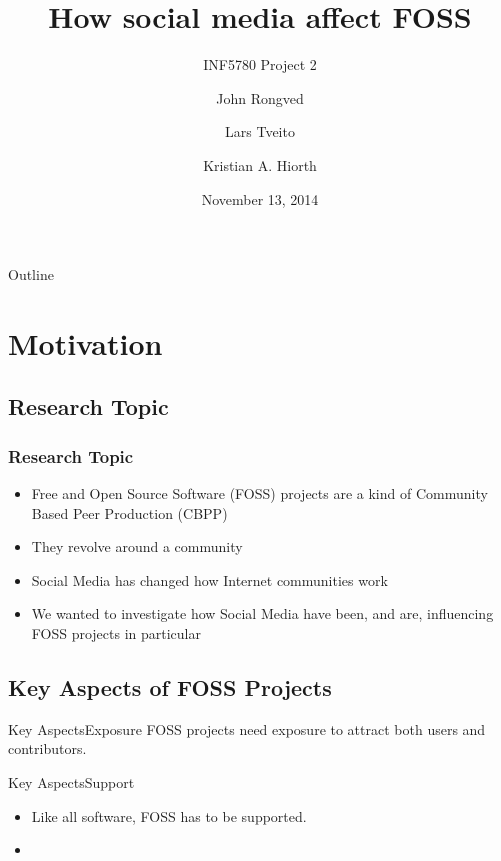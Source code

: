 \documentclass{beamer}
\title{How social media affect FOSS}
\subtitle{INF5780 Project 2}
\author{{John Rongved} \and {Lars Tveito} \and {Kristian A. Hiorth}}
\date{November 13, 2014}
\institute{Department of Informatics\\University of Oslo}
\begin{document}
\begin{frame}
  \titlepage
\end{frame}

\begin{frame}{Outline}
  \tableofcontents{}
\end{frame}

\section{Motivation}

\subsection{Research Topic}

\begin{frame}
  \frametitle{Research Topic}
  \begin{itemize}
  \item Free and Open Source Software (FOSS) projects are a kind of Community
    Based Peer Production (CBPP)
  \item They revolve around a community
  \item Social Media has changed how Internet
    communities work

    \pause

  \item We wanted to investigate how Social Media have been, and are,
    influencing FOSS projects in particular
  \end{itemize}
\end{frame}

\subsection{Key Aspects of FOSS Projects}

\begin{frame}{Key Aspects}{Exposure}
  FOSS projects need exposure to attract both users and contributors.
\end{frame}

\begin{frame}{Key Aspects}{Support}
  \begin{itemize}
  \item Like all software, FOSS has to be supported.
  \item 

  \end{itemize}
\end{frame}
\end{document}
